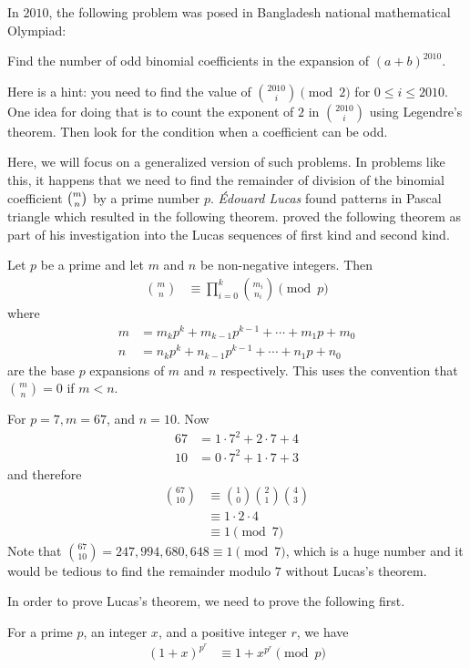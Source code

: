 \documentclass[12pt]{subfile}
\begin{document}
In $2010$, the following problem was posed in Bangladesh national mathematical Olympiad:
	\begin{problem}
		Find the number of odd binomial coefficients in the expansion of $(a+b)^{2010}$.
	\end{problem}
Here is a hint: you need to find the value of $\binom{2010}{i}\pmod2$ for $0\leq i\leq2010$. One idea for doing that is to count the exponent of $2$ in $\binom{2010}{i}$ using Legendre's theorem. Then look for the condition when a coefficient can be odd.

Here, we will focus on a generalized version of such problems. In problems like this, it happens that we need to find the remainder of division of the binomial coefficient $\tbinom{m}{n}$ by a prime number $p$. \textit{\'{E}douard Lucas} found patterns in Pascal triangle which resulted in the following theorem. \textcite[Page $230$, $\S$ XXI]{lucas_1878_2} proved the following theorem as part of his investigation into the Lucas sequences of first kind and second kind.
	\begin{theorem}
		Let $p$ be a prime and let $m$ and $n$ be non-negative integers. Then
			\begin{align*}
				\binom{m}{n}
					& \equiv\prod_{i=0}^k\binom{m_i}{n_i}\pmod p
			\end{align*}
		where
			\begin{align*}
				m & =m_kp^k+m_{k-1}p^{k-1}+\cdots +m_1p+m_0\\
				n & =n_kp^k+n_{k-1}p^{k-1}+\cdots +n_1p+n_0
			\end{align*}
		are the base $p$ expansions of $m$ and $n$ respectively. This uses the convention that $\binom{m}{n}=0$ if $m<n$.
	\end{theorem}

	\begin{example}
		For $p=7, m=67$, and $n=10$. Now
			\begin{align*}
				67
					& = 1 \cdot 7^2 + 2 \cdot 7 + 4\\
				10
					& = 0 \cdot 7^2 + 1 \cdot 7 + 3
			\end{align*}
		and therefore
			\begin{align*}
				\binom{67}{10}
					& \equiv\binom{1}{0}\binom{2}{1}\binom{4}{3}\\
					& \equiv 1 \cdot 2 \cdot 4\\
					& \equiv 1 \pmod 7
			\end{align*}
		Note that $\binom{67}{10} = 247,994,680,648 \equiv 1 \pmod 7$, which is a huge number and it would be tedious to find the remainder modulo $7$ without Lucas's theorem.
	\end{example}
In order to prove Lucas's theorem, we need to prove the following first.
	\begin{lemma}
		For a prime $p$, an integer $x$, and a positive integer $r$, we have
			\begin{align*}
				(1+x)^{p^r}
					& \equiv 1+x^{p^r}\pmod{p}
			\end{align*}
	\end{lemma}
\end{document}
